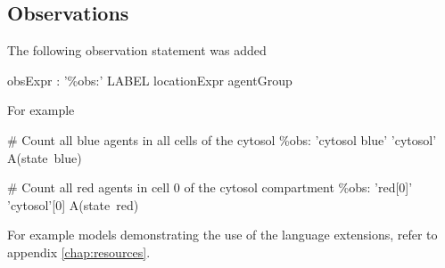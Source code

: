 \subsection{Observations}

The following observation statement was added

\begin{bnfsource}
obsExpr :
  '\%obs:' LABEL locationExpr agentGroup
\end{bnfsource}
For example
\begin{kappasource}
# Count all blue agents in all cells of the cytosol
\%obs: 'cytosol blue' 'cytosol' A(state~blue)

# Count all red agents in cell 0 of the cytosol compartment
\%obs: 'red[0]' 'cytosol'[0] A(state~red) 
\end{kappasource}


\bigskip For example models demonstrating the use of the language extensions, refer to appendix \ref{chap:resources}.

\newpage

